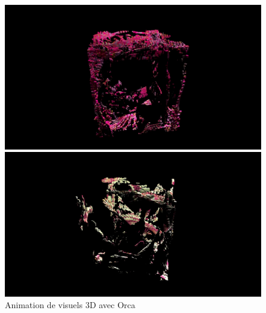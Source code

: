 \begin{figure}[h]
  \begin{minipage}[b]{0.45\linewidth}
    \centering
    \includegraphics[width=\linewidth]{images/experiments/orcatouch00.png}
  \end{minipage}
  \hspace{0.1\linewidth} %
  \begin{minipage}[b]{0.45\linewidth}
    \centering
    \includegraphics[width=\linewidth]{images/experiments/orcatouch01.png}
  \end{minipage}
  \caption{Animation de visuels 3D avec Orca}
  \label{orcatouch00}
\end{figure}

